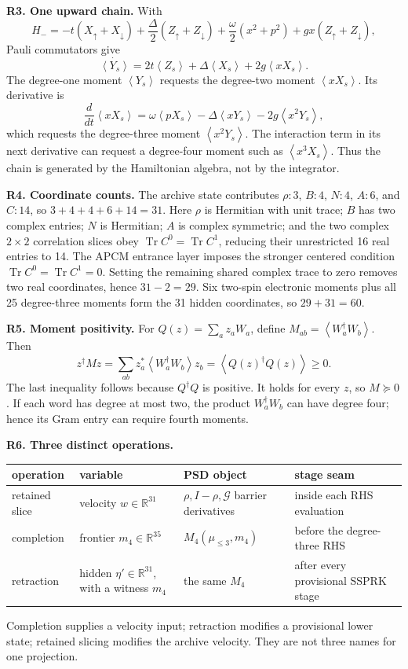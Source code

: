 \documentclass[10pt,letterpaper,twocolumn]{article}
\newcommand{\R}{\mathbb R}
\newcommand{\Tr}{\operatorname{Tr}}
\newcommand{\expect}[1]{\left\langle #1\right\rangle}
\begin{document}
\textbf{R3. One upward chain.}
With
\[
H_-=-t(X_\uparrow+X_\downarrow)
+\frac{\Delta}{2}(Z_\uparrow+Z_\downarrow)
+\frac{\omega}{2}(x^2+p^2)+gx(Z_\uparrow+Z_\downarrow),
\]
Pauli commutators give
\[
\dot{\expect{Y_s}}
=2t\expect{Z_s}+\Delta\expect{X_s}
+2g\expect{xX_s}.
\]
The degree-one moment \(\expect{Y_s}\) requests the degree-two moment
\(\expect{xX_s}\).  Its derivative is
\[
\frac{d}{dt}\expect{xX_s}
=\omega\expect{pX_s}-\Delta\expect{xY_s}
-2g\expect{x^2Y_s},
\]
which requests the degree-three moment \(\expect{x^2Y_s}\).  The interaction
term in its next derivative can request a degree-four moment such as
\(\expect{x^3X_s}\).  Thus the chain is generated by the Hamiltonian algebra,
not by the integrator.

\textbf{R4. Coordinate counts.}
The archive state contributes \(\rho:3\), \(B:4\), \(N:4\), \(A:6\), and
\(C:14\), so \(3+4+4+6+14=31\).
Here \(\rho\) is Hermitian with unit trace; \(B\) has two complex entries;
\(N\) is Hermitian; \(A\) is complex symmetric; and the two complex
\(2\times2\) correlation slices obey
\(\Tr C^0=\Tr C^1\), reducing their unrestricted 16 real entries to 14.
The APCM entrance layer imposes the stronger centered condition
\(\Tr C^0=\Tr C^1=0\).  Setting the remaining shared complex trace to zero
removes two real coordinates, hence \(31-2=29\).  Six two-spin electronic
moments plus all 25 degree-three moments form the 31 hidden coordinates, so
\(29+31=60\).

\textbf{R5. Moment positivity.}
For \(Q(z)=\sum_a z_aW_a\), define
\(M_{ab}=\expect{W_a^\dagger W_b}\).  Then
\[
z^\dagger Mz
=\sum_{ab}z_a^*\expect{W_a^\dagger W_b}z_b
=\expect{Q(z)^\dagger Q(z)}\ge0.
\]
The last inequality follows because \(Q^\dagger Q\) is positive.  It holds
for every \(z\), so \(M\succeq0\).  If each word has degree at most two,
the product \(W_a^\dagger W_b\) can have degree four; hence its Gram entry can
require fourth moments.

\textbf{R6. Three distinct operations.}
\begin{center}
\footnotesize
\begin{tabularx}{\columnwidth}{@{}lYYY@{}}
\toprule
operation & variable & PSD object & stage seam\\
\midrule
retained slice & velocity \(w\in\R^{31}\) & \(\rho, I-\rho,\mathcal G\) barrier derivatives & inside each RHS evaluation\\
completion & frontier \(m_4\in\R^{35}\) & \(M_4(\mu_{\le3},m_4)\) & before the degree-three RHS\\
retraction & hidden \(\eta'\in\R^{31}\), with a witness \(m_4\) & the same \(M_4\) & after every provisional SSPRK stage\\
\bottomrule
\end{tabularx}
\end{center}
Completion supplies a velocity input; retraction modifies a provisional lower
state; retained slicing modifies the archive velocity.  They are not three
names for one projection.
\end{document}
